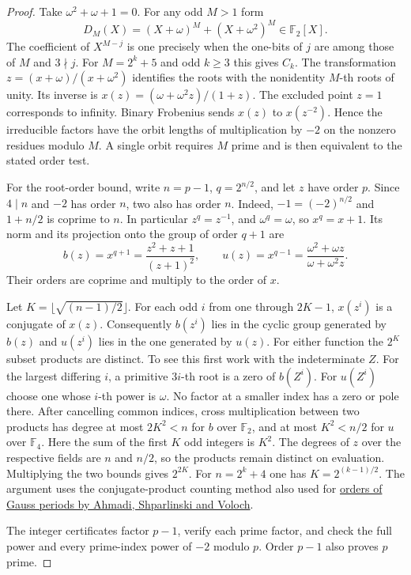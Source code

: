\documentclass[11pt]{article}
\newcommand{\F}{\mathbb F_2}
\begin{document}
\begin{proof}
Take \(\omega^2+\omega+1=0\). For any odd \(M>1\) form
\[
 D_M(X)=(X+\omega)^M+(X+\omega^2)^M\in\F[X].
\]
The coefficient of \(X^{M-j}\) is one precisely when the one-bits
of \(j\) are among those of \(M\) and \(3\nmid j\).
For \(M=2^k+5\) and odd \(k\ge3\) this gives \(C_k\).
The transformation \(z=(x+\omega)/(x+\omega^2)\) identifies the
roots with the nonidentity \(M\)-th roots of unity. Its inverse is
\(x(z)=(\omega+\omega^2z)/(1+z)\). The excluded point \(z=1\)
corresponds to infinity. Binary Frobenius sends \(x(z)\) to
\(x(z^{-2})\). Hence the irreducible factors have the orbit lengths
of multiplication by \(-2\) on the nonzero residues modulo \(M\).
A single orbit requires \(M\) prime and is then equivalent to the
stated order test.

For the root-order bound, write \(n=p-1\), \(q=2^{n/2}\), and let
\(z\) have order \(p\). Since \(4\mid n\) and \(-2\) has order
\(n\), two also has order \(n\). Indeed, \(-1=(-2)^{n/2}\)
and \(1+n/2\) is coprime to \(n\). In particular \(z^q=z^{-1}\),
and \(\omega^q=\omega\), so \(x^q=x+1\). Its norm and its
projection onto the group of order \(q+1\) are
\[
 b(z)=x^{q+1}=\frac{z^2+z+1}{(z+1)^2},\qquad
 u(z)=x^{q-1}=\frac{\omega^2+\omega z}{\omega+\omega^2 z}.
\]
Their orders are coprime and multiply to the order of \(x\).

Let \(K=\lfloor\sqrt{(n-1)/2}\rfloor\). For each odd \(i\) from
one through \(2K-1\), \(x(z^i)\) is a conjugate of \(x(z)\).
Consequently \(b(z^i)\) lies in the cyclic group generated by \(b(z)\)
and \(u(z^i)\) lies in the one generated by \(u(z)\).
For either function the \(2^K\) subset products are distinct.
To see this first work with the indeterminate \(Z\). For the
largest differing \(i\), a primitive \(3i\)-th root is a zero of
\(b(Z^i)\). For \(u(Z^i)\) choose one whose \(i\)-th power is
\(\omega\). No factor at a smaller index has a zero or pole there.
After cancelling common indices, cross multiplication between two
products has degree at most \(2K^2<n\) for \(b\) over \(\F\),
and at most \(K^2<n/2\) for \(u\) over \(\mathbb F_4\).
Here the sum of the first \(K\) odd integers is \(K^2\).
The degrees of \(z\) over the respective fields are \(n\) and \(n/2\),
so the products remain distinct on evaluation. Multiplying the
two bounds gives \(2^{2K}\). For \(n=2^k+4\) one has
\(K=2^{(k-1)/2}\). The argument uses the conjugate-product counting
method also used for \href{https://arxiv.org/abs/0707.4034}
{orders of Gauss periods by Ahmadi, Shparlinski and Voloch}.

The integer certificates factor \(p-1\), verify each prime factor,
and check the full power and every prime-index power of \(-2\)
modulo \(p\). Order \(p-1\) also proves \(p\) prime.
\end{proof}
\end{document}
